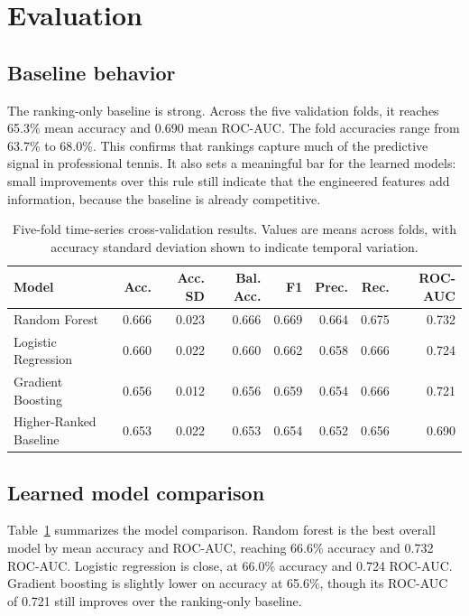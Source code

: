 \documentclass{article}
\begin{document}
\section{Evaluation}
\label{sec:evaluation}

\subsection{Baseline behavior}

The ranking-only baseline is strong. Across the five validation folds, it reaches 65.3\% mean accuracy and 0.690 mean ROC-AUC. The fold accuracies range from 63.7\% to 68.0\%. This confirms that rankings capture much of the predictive signal in professional tennis. It also sets a meaningful bar for the learned models: small improvements over this rule still indicate that the engineered features add information, because the baseline is already competitive.

\begin{table}[t]
  \caption{Five-fold time-series cross-validation results. Values are means across folds, with accuracy standard deviation shown to indicate temporal variation.}
  \label{tab:model-results}
  \centering
  \small
  \begin{tabular}{lrrrrrrr}
    \toprule
    Model & Acc. & Acc. SD & Bal. Acc. & F1 & Prec. & Rec. & ROC-AUC \\
    \midrule
    Random Forest & 0.666 & 0.023 & 0.666 & 0.669 & 0.664 & 0.675 & 0.732 \\
    Logistic Regression & 0.660 & 0.022 & 0.660 & 0.662 & 0.658 & 0.666 & 0.724 \\
    Gradient Boosting & 0.656 & 0.012 & 0.656 & 0.659 & 0.654 & 0.666 & 0.721 \\
    Higher-Ranked Baseline & 0.653 & 0.022 & 0.653 & 0.654 & 0.652 & 0.656 & 0.690 \\
    \bottomrule
  \end{tabular}
\end{table}

\subsection{Learned model comparison}

Table~\ref{tab:model-results} summarizes the model comparison. Random forest is the best overall model by mean accuracy and ROC-AUC, reaching 66.6\% accuracy and 0.732 ROC-AUC. Logistic regression is close, at 66.0\% accuracy and 0.724 ROC-AUC. Gradient boosting is slightly lower on accuracy at 65.6\%, though its ROC-AUC of 0.721 still improves over the ranking-only baseline.
\end{document}
